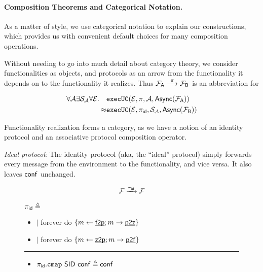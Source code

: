 \paragraph{Composition Theorems and Categorical Notation.}
As a matter of style, we use categorical notation to explain our constructions, which provides us with convenient default choices for many composition operations.

Without needing to go into much detail about category theory, we consider functionalities as objects, and protocols as an arrow from the functionality it depends on to the functionality it realizes. Thus
\mbox{$\F{A} \overset{\pi}{\longrightarrow} \F{B}$}
is an abbreviation for

\begin{align*}
\forall \A \exists \S_\A \forall \Z. \quad
 &         \execUC{\Z}{\pi}{\A}{\msf{Async}(\F{A})} \\ 
 \approx &  \execUC{\Z}{\pi_\msf{id}}{\S_\A}{\msf{Async}(\F{B})}
\end{align*}


Functionality realization forms a category, as we have a notion of an identity protocol and an associative protocol composition operator.

\emph{Ideal protocol}:
The identity protocol (aka, the ``ideal'' protocol) simply forwards every message from the environment to the functionality, and vice versa. It also leaves ${\mathsf {conf}}$ unchanged.
\begin{theorem}
\[
\F{} \xrightarrow{\pi_\msf{id}} \F{}
\]
\end{theorem}
\begin{figure}[h!]
\begin{boxedminipage}{\columnwidth}
\begin{centering}
$\pi_{{\mathsf {id}}} \triangleq$
\end{centering}
\small
\begin{itemize}[leftmargin=2mm]
\item[] $|$ forever do $\{m \leftarrow {\underline{\smash{\ensuremath{{\mathsf {f2p}}}}}}; m \rightarrow {\underline{\smash{\ensuremath{{\mathsf {p2z}}}}}} \}$
\item[] $|$ forever do $\{m \leftarrow {\underline{\smash{\ensuremath{{\mathsf {z2p}}}}}}; m \rightarrow {\underline{\smash{\ensuremath{{\mathsf {p2f}}}}}} \}$
\end{itemize}
\hrule
\begin{itemize}[leftmargin=2mm]
\item[] $\pi_{{\mathsf {id}}}.\mathtt {cmap}~ {\mathsf {SID}}~ {\mathsf {conf}} \triangleq {\mathsf {conf}}$
\end{itemize}
\end{boxedminipage}
\end{figure}

